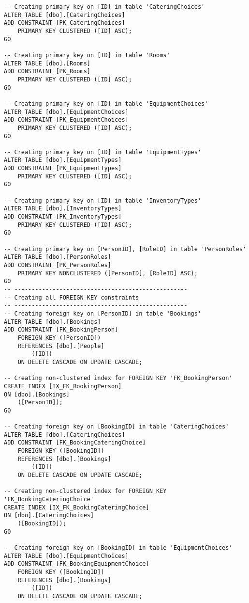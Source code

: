 \begin{lstlisting}[label=SQL, caption= SQL-kode til oprettelse af database]
-- Creating primary key on [ID] in table 'CateringChoices'
ALTER TABLE [dbo].[CateringChoices]
ADD CONSTRAINT [PK_CateringChoices]
    PRIMARY KEY CLUSTERED ([ID] ASC);
GO

-- Creating primary key on [ID] in table 'Rooms'
ALTER TABLE [dbo].[Rooms]
ADD CONSTRAINT [PK_Rooms]
    PRIMARY KEY CLUSTERED ([ID] ASC);
GO

-- Creating primary key on [ID] in table 'EquipmentChoices'
ALTER TABLE [dbo].[EquipmentChoices]
ADD CONSTRAINT [PK_EquipmentChoices]
    PRIMARY KEY CLUSTERED ([ID] ASC);
GO

-- Creating primary key on [ID] in table 'EquipmentTypes'
ALTER TABLE [dbo].[EquipmentTypes]
ADD CONSTRAINT [PK_EquipmentTypes]
    PRIMARY KEY CLUSTERED ([ID] ASC);
GO

-- Creating primary key on [ID] in table 'InventoryTypes'
ALTER TABLE [dbo].[InventoryTypes]
ADD CONSTRAINT [PK_InventoryTypes]
    PRIMARY KEY CLUSTERED ([ID] ASC);
GO

-- Creating primary key on [PersonID], [RoleID] in table 'PersonRoles'
ALTER TABLE [dbo].[PersonRoles]
ADD CONSTRAINT [PK_PersonRoles]
    PRIMARY KEY NONCLUSTERED ([PersonID], [RoleID] ASC);
GO
-- --------------------------------------------------
-- Creating all FOREIGN KEY constraints
-- --------------------------------------------------
-- Creating foreign key on [PersonID] in table 'Bookings'
ALTER TABLE [dbo].[Bookings]
ADD CONSTRAINT [FK_BookingPerson]
    FOREIGN KEY ([PersonID])
    REFERENCES [dbo].[People]
        ([ID])
    ON DELETE CASCADE ON UPDATE CASCADE;

-- Creating non-clustered index for FOREIGN KEY 'FK_BookingPerson'
CREATE INDEX [IX_FK_BookingPerson]
ON [dbo].[Bookings]
    ([PersonID]);
GO

-- Creating foreign key on [BookingID] in table 'CateringChoices'
ALTER TABLE [dbo].[CateringChoices]
ADD CONSTRAINT [FK_BookingCateringChoice]
    FOREIGN KEY ([BookingID])
    REFERENCES [dbo].[Bookings]
        ([ID])
    ON DELETE CASCADE ON UPDATE CASCADE;

-- Creating non-clustered index for FOREIGN KEY 'FK_BookingCateringChoice'
CREATE INDEX [IX_FK_BookingCateringChoice]
ON [dbo].[CateringChoices]
    ([BookingID]);
GO

-- Creating foreign key on [BookingID] in table 'EquipmentChoices'
ALTER TABLE [dbo].[EquipmentChoices]
ADD CONSTRAINT [FK_BookingEquipmentChoice]
    FOREIGN KEY ([BookingID])
    REFERENCES [dbo].[Bookings]
        ([ID])
    ON DELETE CASCADE ON UPDATE CASCADE;


\end{lstlisting}
